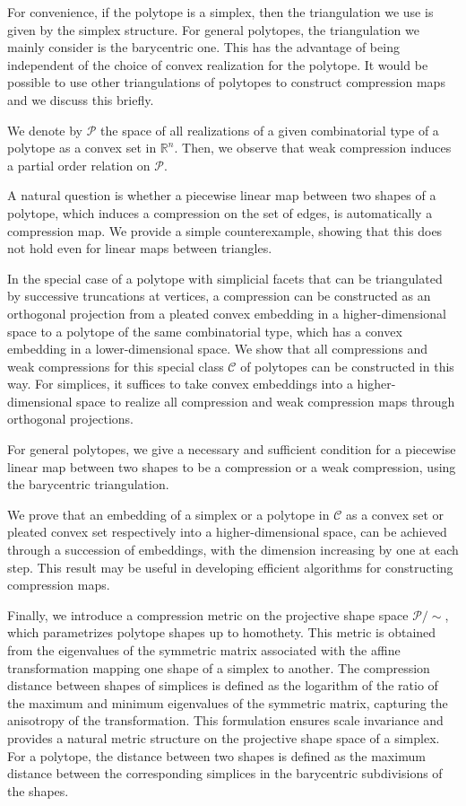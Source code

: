 \documentclass[a4paper, 12pt]{amsart}
\theoremstyle{plain}
\begin{document}
 For convenience, if the polytope is a simplex, then the triangulation we use is given by the simplex structure. For general polytopes, the triangulation we mainly consider is the barycentric one. This has the advantage of being independent of the choice of convex realization for the polytope. It would be possible to use other triangulations of polytopes to construct compression maps and we discuss this briefly. 

We denote by $\mathcal{P}$ the space of all realizations of a given combinatorial type of a polytope as a convex set in $\mathbb{R}^n$. Then, we observe that weak compression induces a partial order relation on $\mathcal{P}$.

A natural question is whether a piecewise linear map between two shapes of a polytope, which induces a compression on the set of edges, is automatically a compression map. We provide a simple counterexample, showing that this does not hold even for linear maps between triangles. 

In the special case of a polytope with simplicial facets that can be triangulated by successive truncations at vertices, a compression can be constructed as an orthogonal projection from a pleated convex embedding in a higher-dimensional space to a polytope of the same combinatorial type, which has a convex embedding in a lower-dimensional space. We show that all compressions and weak compressions for this special class $\mathcal{C}$ of polytopes can be constructed in this way. For simplices, it suffices to take convex embeddings into a higher-dimensional space to realize all compression and weak compression maps through orthogonal projections. 

For general polytopes, we give a necessary and sufficient condition for a piecewise linear map between two shapes to be a compression or a weak compression, using the barycentric triangulation. 

We prove that an embedding of a simplex or a polytope in $\mathcal{C}$ as a convex set or pleated convex set respectively into a higher-dimensional space, can be achieved through a succession of embeddings, with the dimension increasing by one at each step. This result may be useful in developing efficient algorithms for constructing compression maps.

Finally, we introduce a compression metric on the projective shape space $\mathcal{P} / \sim$, which parametrizes polytope shapes up to homothety. This metric is obtained from the eigenvalues of the symmetric matrix associated with the affine transformation mapping one shape of a simplex to another. The compression distance between shapes of simplices is defined as the logarithm of the ratio of the maximum and minimum eigenvalues of the symmetric matrix, capturing the anisotropy of the transformation. This formulation ensures scale invariance and provides a natural metric structure on the projective shape space of a simplex. For a polytope, the distance between two shapes is defined as the maximum distance between the corresponding simplices in the barycentric subdivisions of the shapes. 
\end{document}
